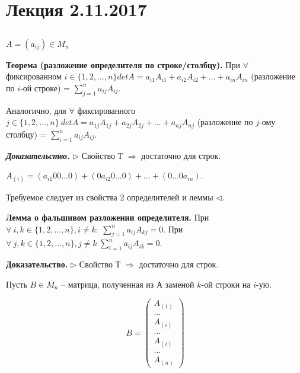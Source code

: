 \section{Лекция 2.11.2017}

\subsection{}

$A = (a_{ij}) \in M_n$

\vspace{\baselineskip}
\textbf{Теорема (разложение определителя по строке/столбцу).} При $\forall$ фиксированном $i \in \{1, 2, \dots, n\} detA = a_{i1}A_{i1} + a_{i2}A_{i2} + \dots + a_{in}A_{in}$ (разложение по $i$-ой строке) = $\sum\limits_{j = 1}^n a_{ij}A_{ij}$.

Аналогично, для $\forall$ фиксированного $j \in \{1, 2, \dots, n\} \ detA = a_{1j}A_{1j} + a_{2j}A_{2j} + \dots + a_{nj}A_{nj}$ (разложение по $j$-ому столбцу) = $\sum\limits_{i = 1}^n a_{ij}A_{ij}$.

\vspace{\baselineskip}
\textbf{\textit{Доказательство.}} $\rhd$ Свойство Т $\Rightarrow$ достаточно для строк. 

$A_{(i)} = (a_{i1} 00 \dots 0) + (0 a_{i2} 0 \dots 0) + \dots + (0 \dots 0 a_{in})$. 

Требуемое следует из свойства 2 определителей и леммы $\lhd$.

\vspace{\baselineskip}
\textbf{Лемма о фальшивом разложении определителя.} При $\forall \ i, k \in \{1, 2, \dots, n\}, i \neq k: \ \sum\limits_{j = 1}^n a_{ij}A_{kj} = 0$. При $\forall \ j, k \in \{1, 2, \dots, n\}, j \neq k \ \sum\limits_{i = 1}^n a_{ij}A_{ik} = 0$.

\vspace{\baselineskip}
\textbf{Доказательство.} $\rhd$ Свойство Т $\Rightarrow$ достаточно для строк.

Пусть $B \in M_n$ -- матрица, полученная из А заменой $k$-ой строки на $i$-ую.

\vspace{\baselineskip}
\begin{equation*}B = \begin{pmatrix} A_{(1)} \\ \dots \\ A_{(i)} \\ \dots \\ A_{(i)} \\ \dots \\ A_{(n)} \end{pmatrix}
\end{equation*}

